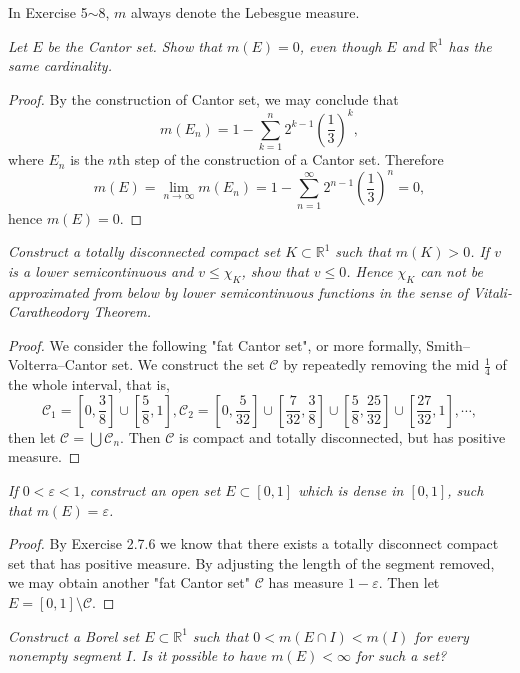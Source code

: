 In Exercise 5$\sim$8, $m$ always denote the Lebesgue measure.
\begin{problem}\em
Let $E$ be the Cantor set. Show that $m(E)=0$, even though $E$ and $\mathbb{R}^1$ has the same cardinality.
\end{problem}
\begin{proof}
By the construction of Cantor set, we may conclude that 
$$m(E_n)=1-\sum_{k=1}^n2^{k-1}\left(\frac{1}{3}\right)^k,$$
where $E_n$ is the $n$th step of the construction of a Cantor set. Therefore 
$$m(E)=\lim_{n\to\infty}m(E_n)=1-\sum_{n=1}^\infty2^{n-1}\left(\frac{1}{3}\right)^n=0,$$
hence $m(E)=0$.
\end{proof}
\begin{problem}\em
Construct a totally disconnected compact set $K\subset\mathbb{R}^1$ such that $m(K)>0$. If $v$ is a lower semicontinuous and $v\le\chi_K$, show that $v\le 0$. Hence $\chi_K$ can not be approximated from below by lower semicontinuous functions in the sense of Vitali-Caratheodory Theorem.
\end{problem}
\begin{proof}
We consider the following "fat Cantor set", or more formally, Smith–Volterra–Cantor set. We construct the set $\mathcal{C}$ by repeatedly removing the mid $\frac{1}{4}$ of the whole interval, that is, 
$$
\mathcal{C} _1=\left[ 0,\frac{3}{8} \right] \cup \left[ \frac{5}{8},1 \right] ,\mathcal{C} _2=\left[ 0,\frac{5}{32} \right] \cup \left[ \frac{7}{32},\frac{3}{8} \right] \cup \left[ \frac{5}{8},\frac{25}{32} \right] \cup \left[ \frac{27}{32},1 \right] ,\cdots ,
$$
then let $\mathcal{C}=\bigcup\mathcal{C}_n$. Then $\mathcal{C}$ is compact and totally disconnected, but has positive measure.
\end{proof}
\begin{problem}\em
If $0<\varepsilon<1$, construct an open set $E\subset[0,1]$ which is dense in $[0,1]$, such that $m(E)=\varepsilon$.
\end{problem}
\begin{proof}
By Exercise 2.7.6 we know that there exists a totally disconnect compact set that has positive measure. By adjusting the length of the segment removed, we may obtain another "fat Cantor set" $\mathcal{C}$ has measure $1-\varepsilon$. Then let $E=[0,1]\setminus\mathcal{C}$.
\end{proof}
\begin{problem}\em
Construct a Borel set $E\subset\mathbb{R}^1$ such that $0<m(E\cap I)<m(I)$ for every nonempty segment $I$. Is it possible to have $m(E)<\infty$ for such a set?
\end{problem}
